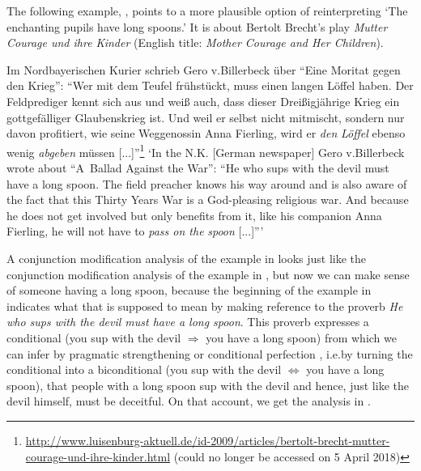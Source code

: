 \documentclass[output=paper]{langsci/langscibook}
\begin{document}
The following example, , points to a more plausible option of reinterpreting `The enchanting pupils have long spoons.' It is about Bertolt Brecht's play \textit{Mutter Courage und ihre Kinder} (English title: \textit{Mother Courage and Her Children}).

\ea \label{quoted long spoon}
Im Nordbayerischen Kurier schrieb Gero v.\@ Billerbeck über ``Eine Moritat gegen den Krieg'': ``Wer mit dem Teufel frühstückt, muss einen langen Löffel haben. Der Feldprediger kennt sich aus und weiß auch, dass dieser Dreißigjährige Krieg ein gottgefälliger Glaubenskrieg ist. Und weil er selbst nicht mitmischt, sondern nur davon profitiert, wie seine Wegge\-nos\-sin Anna Fierling, wird er \textit{den} \underline{} \textit{Löffel} ebenso wenig \textit{abgeben} müssen [...]''\footnote{\url{http://www.luisenburg-aktuell.de/id-2009/articles/bertolt-brecht-mutter-courage-und-ihre-kinder.html} (could no longer be accessed on 5 April 2018)}
\glt `In the N.K. [German newspaper] Gero v.\@ Billerbeck wrote about ``\mbox{A Ballad} Against the War'': ``He who sups with the devil must have a long spoon. The field preacher knows his way around and is also aware of the fact that this Thirty Years War is a God-pleasing religious war. And because he does not get involved but only benefits from it, like his companion Anna Fierling, he will not have to \textit{pass on the} \underline{} \textit{spoon} [...]'''
\z

\noindent A conjunction modification analysis of the example in  looks just like the conjunction modification analysis of the example in , but now we can make sense of someone having a long spoon, because the beginning of the example in  indicates what that is supposed to mean by making reference to the proverb \textit{He who sups with the devil must have a long spoon}. This proverb expresses a conditional (you sup with the devil $\Rightarrow$ you have a long spoon) from which we can infer by pragmatic strengthening or conditional perfection \citep[][]{geiszwicky71}, i.e.\@ by turning the conditional into a biconditional (you sup with the devil $\Leftrightarrow$ you have a long spoon), that people with a long spoon sup with the devil and hence, just like the devil himself, must be deceitful. On that account, we get the analysis in .\largerpage[-2]
\end{document}
